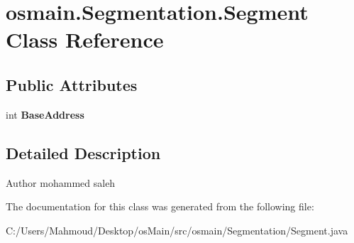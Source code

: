 \hypertarget{classosmain_1_1_segmentation_1_1_segment}{}\section{osmain.\+Segmentation.\+Segment Class Reference}
\label{classosmain_1_1_segmentation_1_1_segment}
\subsection*{Public Attributes}
\begin{DoxyCompactItemize}
\item 
int {\bfseries Base\+Address}\hypertarget{classosmain_1_1_segmentation_1_1_segment_a408b7f68eb9dd5f54f105543d2909712}{}\label{classosmain_1_1_segmentation_1_1_segment_a408b7f68eb9dd5f54f105543d2909712}

\end{DoxyCompactItemize}


\subsection{Detailed Description}
\begin{DoxyAuthor}{Author}
mohammed saleh 
\end{DoxyAuthor}


The documentation for this class was generated from the following file\+:\begin{DoxyCompactItemize}
\item 
C\+:/\+Users/\+Mahmoud/\+Desktop/os\+Main/src/osmain/\+Segmentation/Segment.\+java\end{DoxyCompactItemize}
